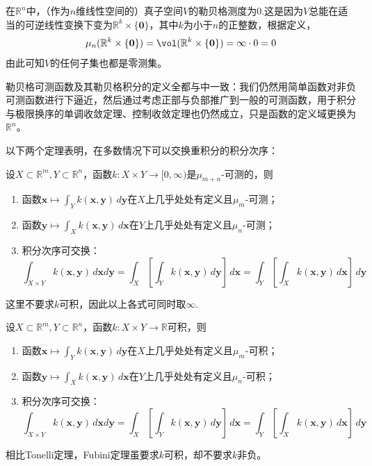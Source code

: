 \begin{example}
    在$\mathbb{R}^n$中，（作为$n$维线性空间的）真子空间$V$的勒贝格测度为0.这是因为$V$总能在适当的可逆线性变换下变为$\mathbb{R}^k\times\{\mathbf{0}\}$，其中$k$为小于$n$的正整数，根据定义，
    $$\mu_n(\mathbb{R}^k\times\{\mathbf{0}\})=\vol(\mathbb{R}^k\times\{\mathbf{0}\})=\infty\cdot 0=0$$
    由此可知$V$的任何子集也都是零测集。
\end{example}

勒贝格可测函数及其勒贝格积分的定义全都与中一致：我们仍然用简单函数对非负可测函数进行下逼近，然后通过考虑正部与负部推广到一般的可测函数，用于积分与极限换序的单调收敛定理、控制收敛定理也仍然成立，只是函数的定义域更换为$\mathbb{R}^n$。

以下两个定理表明，在多数情况下可以交换重积分的积分次序：
\begin{theorem}[Tonelli定理]\label{thm:tonelli}
    设$X\subset\mathbb{R}^m,Y\subset\mathbb{R}^n$，函数$k:X\times Y\to[0,\infty)$是$\mu_{m+n}$-可测的，则\begin{enumerate}
        \item 函数$\mathbf{x}\mapsto \int_{Y}k(\mathbf{x},\mathbf{y})\,d\mathbf{y}$在$X$上几乎处处有定义且$\mu_m$-可测；
        \item 函数$\mathbf{y}\mapsto \int_{X}k(\mathbf{x},\mathbf{y})\,d\mathbf{x}$在$Y$上几乎处处有定义且$\mu_n$-可测；
        \item 积分次序可交换：
              $$\int_{X\times Y}k(\mathbf{x},\mathbf{y})\,d\mathbf{x}d\mathbf{y}=\int_X\left[\int_Y k(\mathbf{x},\mathbf{y})\,d\mathbf{y}\right]\,d\mathbf{x}=\int_Y\left[\int_X k(\mathbf{x},\mathbf{y})\,d\mathbf{x}\right]\,d\mathbf{y}$$
    \end{enumerate}
    这里不要求$k$可积，因此以上各式可同时取$\infty$.
\end{theorem}

\begin{theorem}[Fubini定理]\label{thm:fubini}
    设$X\subset\mathbb{R}^m,Y\subset\mathbb{R}^n$，函数$k:X\times Y\to\mathbb{R}$可积，则\begin{enumerate}
        \item 函数$\mathbf{x}\mapsto \int_{Y}k(\mathbf{x},\mathbf{y})\,d\mathbf{y}$在$X$上几乎处处有定义且$\mu_m$-可积；
        \item 函数$\mathbf{y}\mapsto \int_{X}k(\mathbf{x},\mathbf{y})\,d\mathbf{x}$在$Y$上几乎处处有定义且$\mu_n$-可积；
        \item 积分次序可交换：
              $$\int_{X\times Y}k(\mathbf{x},\mathbf{y})\,d\mathbf{x}d\mathbf{y}=\int_X\left[\int_Y k(\mathbf{x},\mathbf{y})\,d\mathbf{y}\right]\,d\mathbf{x}=\int_Y\left[\int_X k(\mathbf{x},\mathbf{y})\,d\mathbf{x}\right]\,d\mathbf{y}$$
    \end{enumerate}
\end{theorem}
相比Tonelli定理，Fubini定理虽要求$k$可积，却不要求$k$非负。

